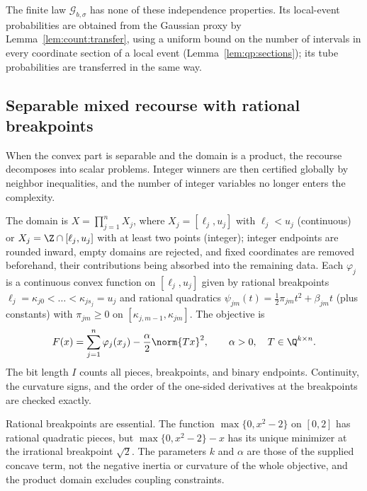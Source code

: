 The finite law $\mathcal G_{b,\sigma}$ has none of these independence
properties. Its local-event probabilities are obtained from the Gaussian
proxy by Lemma~\ref{lem:count:transfer}, using a uniform bound on the
number of intervals in every coordinate section of a local event
(Lemma~\ref{lem:qp:sections}); its tube probabilities are transferred in the
same way.

\subsection{Separable mixed recourse with rational breakpoints}\label{sec:qp:separable}

When the convex part is separable and the domain is a product, the recourse
decomposes into scalar problems. Integer winners are then certified globally
by neighbor inequalities, and the number of integer variables no longer
enters the complexity.

\begin{definition}\label{def:qp:sep}
The domain is $X=\prod_{j=1}^nX_j$, where $X_j=[\ell_j,u_j]$ with
$\ell_j<u_j$ (continuous) or $X_j=\Z\cap[\ell_j,u_j]$ with at least two
points (integer); integer endpoints are rounded inward, empty domains are
rejected, and fixed coordinates are removed beforehand, their contributions
being absorbed into the remaining data. Each $\varphi_j$ is a continuous
convex function on $[\ell_j,u_j]$ given by rational breakpoints
$\ell_j=\kappa_{j0}<\dots<\kappa_{js_j}=u_j$ and rational quadratics
$\psi_{jm}(t)=\frac12\pi_{jm}t^2+\beta_{jm}t$ (plus constants) with
$\pi_{jm}\ge0$ on $[\kappa_{j,m-1},\kappa_{jm}]$. The objective is
\[
 F(x)=\sum_{j=1}^n\varphi_j(x_j)-\frac\alpha2\norm{Tx}^2,
 \qquad\alpha>0,\quad T\in\Q^{k\times n}.
\]
The bit length $I$ counts all pieces, breakpoints, and binary endpoints.
Continuity, the curvature signs, and the order of the one-sided derivatives at
the breakpoints are checked exactly.
\end{definition}

Rational breakpoints are essential. The function $\max\{0,x^2-2\}$ on $[0,2]$
has rational quadratic pieces, but $\max\{0,x^2-2\}-x$ has its unique minimizer
at the irrational breakpoint $\sqrt2$. The parameters $k$ and $\alpha$ are
those of the supplied concave term, not the negative inertia or curvature of
the whole objective, and the product domain excludes coupling constraints.


